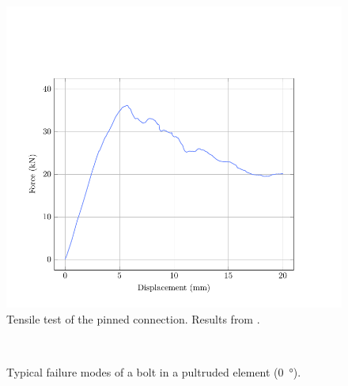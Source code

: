 \begin{figure}[p]
\centering
\begin{fullpage}
	\includegraphics[]{ch2a_creteil/plot/6_pin/build.pdf}
	\caption[Tensile test of the pinned connection]{Tensile test of the pinned connection. Results from \cite{Tayeb2015a}.}
	\label{plot:pintest}
\end{fullpage}
\end{figure}

\begin{figure}[p]
     	\centering
	\begin{fullpage}	
		 \\
		\vspace{10pt}
		\caption[Typical failure modes of a bolt in a pultruded element ]{Typical failure modes of a bolt in a pultruded element (\SI{0}{\degree}).}
		\label{fig:breaking}    
	\end{fullpage}
\end{figure}


